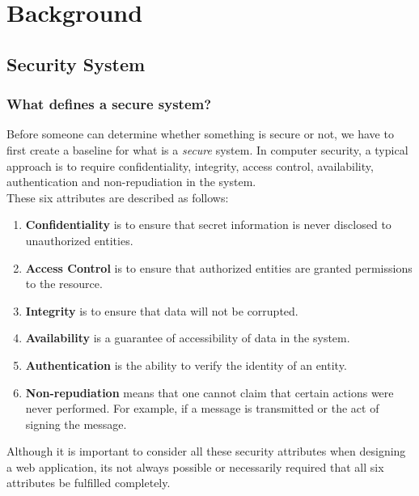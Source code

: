 \chapter{Background}\label{C:background}

\section{Security System}
	\subsection{What defines a secure system?}
		Before someone can determine whether something is secure or not, we have to first create a baseline for what is a \emph{secure} system. In computer security, a typical approach is to require confidentiality, integrity, access control, availability, authentication and non-repudiation in the system\cite{Pfleeger:2006:SC:1177321}. \\

		These six attributes are described as follows:
		
		\begin{enumerate}
		
			\item \textbf{Confidentiality} is to ensure that secret information is never disclosed to unauthorized entities.

			\item \textbf{Access Control} is to ensure that authorized entities are granted permissions to the resource.
		
			\item \textbf{Integrity} is to ensure that data will not be corrupted.
	
			\item \textbf{Availability} is a guarantee of accessibility of data in the system.
			
			\item \textbf{Authentication} is the ability to verify the identity of an entity.
		
			\item \textbf{Non-repudiation} means that one cannot claim that certain actions were never performed. For example, if a message is transmitted or the act of signing the message.

		\end{enumerate}
		
		Although it is important to consider all these security attributes when designing a web application, its not always possible or necessarily required that all six attributes be fulfilled completely.
		
